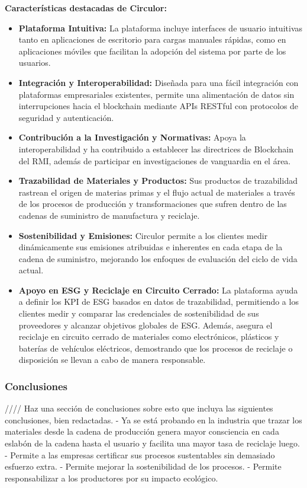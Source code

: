 \documentclass[main.tex]{subfiles}
\begin{document}
\textbf{Características destacadas de Circulor:}
\begin{itemize}
  \item \textbf{Plataforma Intuitiva:} La plataforma incluye interfaces de usuario intuitivas tanto en aplicaciones de escritorio para cargas manuales rápidas, como en aplicaciones móviles que facilitan la adopción del sistema por parte de los usuarios.
  \item \textbf{Integración y Interoperabilidad:} Diseñada para una fácil integración con plataformas empresariales existentes, permite una alimentación de datos sin interrupciones hacia el blockchain mediante APIs RESTful con protocolos de seguridad y autenticación.
  \item \textbf{Contribución a la Investigación y Normativas:} Apoya la interoperabilidad y ha contribuido a establecer las directrices de Blockchain del RMI, además de participar en investigaciones de vanguardia en el área.
  \item \textbf{Trazabilidad de Materiales y Productos:} Sus productos de trazabilidad rastrean el origen de materias primas y el flujo actual de materiales a través de los procesos de producción y transformaciones que sufren dentro de las cadenas de suministro de manufactura y reciclaje.
  \item \textbf{Sostenibilidad y Emisiones:} Circulor permite a los clientes medir dinámicamente sus emisiones atribuidas e inherentes en cada etapa de la cadena de suministro, mejorando los enfoques de evaluación del ciclo de vida actual.
  \item \textbf{Apoyo en ESG y Reciclaje en Circuito Cerrado:} La plataforma ayuda a definir los KPI de ESG basados en datos de trazabilidad, permitiendo a los clientes medir y comparar las credenciales de sostenibilidad de sus proveedores y alcanzar objetivos globales de ESG. Además, asegura el reciclaje en circuito cerrado de materiales como electrónicos, plásticos y baterías de vehículos eléctricos, demostrando que los procesos de reciclaje o disposición se llevan a cabo de manera responsable.
\end{itemize}

\subsubsection{Conclusiones}

////
Haz una sección de conclusiones sobre esto que incluya las siguientes conclusiones, bien redactadas.
- Ya se está probando en la industria que trazar los materiales desde la cadena de producción genera mayor consciencia en cada eslabón de la cadena hasta el usuario y facilita una mayor tasa de reciclaje luego.
- Permite a las empresas certificar sus procesos sustentables sin demasiado esfuerzo extra.
- Permite mejorar la sostenibilidad de los procesos.
- Permite responsabilizar a los productores por su impacto ecológico.
\end{document}
